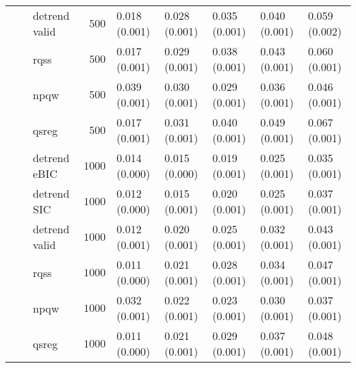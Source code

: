 \begin{table}[!tbp]
\begin{center}
\begin{tabular}{llrlllll}
~~&detrend valid&$ 500$&0.018 (0.001)&0.028 (0.001)&0.035 (0.001)&0.040 (0.001)&0.059 (0.002)\tabularnewline
~~&rqss&$ 500$&0.017 (0.001)&0.029 (0.001)&0.038 (0.001)&0.043 (0.001)&0.060 (0.001)\tabularnewline
~~&npqw&$ 500$&0.039 (0.001)&0.030 (0.001)&0.029 (0.001)&0.036 (0.001)&0.046 (0.001)\tabularnewline
~~&qsreg&$ 500$&0.017 (0.001)&0.031 (0.001)&0.040 (0.001)&0.049 (0.001)&0.067 (0.001)\tabularnewline
~~&detrend eBIC&$1000$&0.014 (0.000)&0.015 (0.000)&0.019 (0.001)&0.025 (0.001)&0.035 (0.001)\tabularnewline
~~&detrend SIC&$1000$&0.012 (0.000)&0.015 (0.001)&0.020 (0.001)&0.025 (0.001)&0.037 (0.001)\tabularnewline
~~&detrend valid&$1000$&0.012 (0.001)&0.020 (0.001)&0.025 (0.001)&0.032 (0.001)&0.043 (0.001)\tabularnewline
~~&rqss&$1000$&0.011 (0.000)&0.021 (0.001)&0.028 (0.001)&0.034 (0.001)&0.047 (0.001)\tabularnewline
~~&npqw&$1000$&0.032 (0.001)&0.022 (0.001)&0.023 (0.001)&0.030 (0.001)&0.037 (0.001)\tabularnewline
~~&qsreg&$1000$&0.011 (0.000)&0.021 (0.001)&0.029 (0.001)&0.037 (0.001)&0.048 (0.001)\tabularnewline
\hline
\end{tabular}\end{center}
\end{table}

